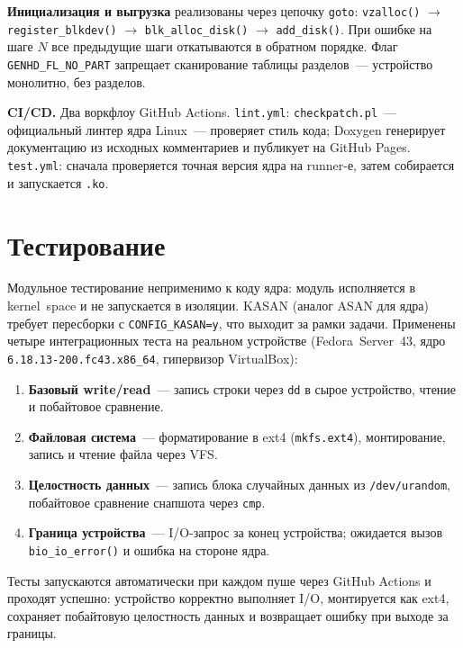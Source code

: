 \documentclass[a4paper]{article}
\begin{document}
\textbf{Инициализация и выгрузка} реализованы через цепочку \texttt{goto}:
\texttt{vzalloc()} $\to$ \texttt{register\_blkdev()} $\to$ \texttt{blk\_alloc\_disk()}
$\to$ \texttt{add\_disk()}. При ошибке на шаге $N$ все предыдущие шаги
откатываются в обратном порядке. Флаг \texttt{GENHD\_FL\_NO\_PART} запрещает
сканирование таблицы разделов~--- устройство монолитно, без разделов.

\textbf{CI/CD.} Два воркфлоу GitHub Actions. \texttt{lint.yml}: \texttt{checkpatch.pl}~---
официальный линтер ядра Linux~--- проверяет стиль кода; Doxygen
генерирует документацию из исходных комментариев и публикует на GitHub Pages.
\texttt{test.yml}: сначала проверяется точная версия ядра на runner-е, затем
собирается и запускается \texttt{.ko}.

\section{Тестирование}

Модульное тестирование неприменимо к коду ядра: модуль исполняется в kernel~space
и не запускается в изоляции. KASAN (аналог ASAN для ядра) требует пересборки
с \texttt{CONFIG\_KASAN=y}, что выходит за рамки задачи. Применены четыре
интеграционных теста на реальном устройстве (Fedora~Server~43, ядро
\texttt{6.18.13-200.fc43.x86\_64}, гипервизор VirtualBox):

\begin{enumerate}
    \item \textbf{Базовый write/read}~--- запись строки через \texttt{dd}
          в сырое устройство, чтение и побайтовое сравнение.
    \item \textbf{Файловая система}~--- форматирование в ext4 (\texttt{mkfs.ext4}),
          монтирование, запись и чтение файла через VFS.
    \item \textbf{Целостность данных}~--- запись блока случайных данных из
          \texttt{/dev/urandom}, побайтовое сравнение снапшота через \texttt{cmp}.
    \item \textbf{Граница устройства}~--- I/O-запрос за конец устройства;
          ожидается вызов \texttt{bio\_io\_error()} и ошибка на стороне ядра.
\end{enumerate}

Тесты запускаются автоматически при каждом пуше через GitHub Actions и проходят
успешно: устройство корректно выполняет I/O, монтируется как ext4, сохраняет
побайтовую целостность данных и возвращает ошибку при выходе за границы.
\end{document}
